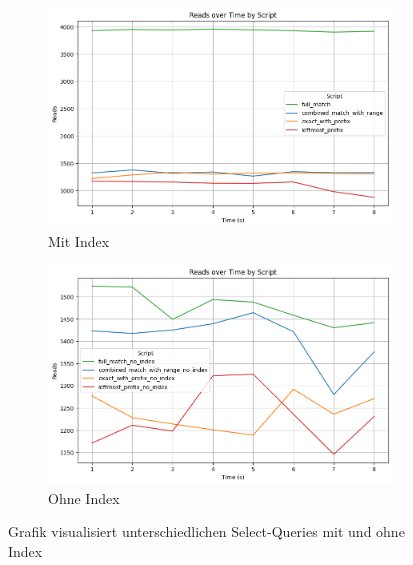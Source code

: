 \begin{figure}[H]
    \centering
    \begin{subfigure}[t]{0.48\textwidth}
        \centering
        \includegraphics[width=\textwidth]{PNGs/Script/Index/Hash/hash-query-differences/Reads}
        \caption{Mit Index}
        \label{indexing-hash-query-reads-index}
    \end{subfigure}
    \hfill
    \begin{subfigure}[t]{0.48\textwidth}
        \centering
        \includegraphics[width=\textwidth]{PNGs/Script/Index/Hash/hash-query-differences-no-index/Reads}
        \caption{Ohne Index}
        \label{indexing-hash-query-reads-no-index}
    \end{subfigure}
    \caption[Hash-Indexing: Unterschiedliche Abfragen mit Index und Ohne]{Grafik visualisiert unterschiedlichen Select-Queries mit und ohne Index}
    \label{fig:indexing-hash-query-reads}
\end{figure}
\vspace{-15pt}